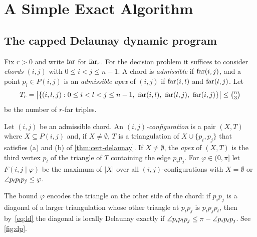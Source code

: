 \chapter{A Simple Exact Algorithm}\label{ch:exact}
\section{The capped Delaunay dynamic program}\label{sec:dp}

Fix $r>0$ and write $\mathrm{far}$ for $\mathrm{far}_r$. For the decision problem it suffices
to consider \emph{chords} $(i,j)$ with $0\le i<j\le n-1$. A chord is
\emph{admissible} if $\mathrm{far}(i,j)$, and a point $p_l\in P(i,j)$ is an
\emph{admissible apex} of $(i,j)$ if $\mathrm{far}(i,l)$ and $\mathrm{far}(l,j)$. Let
\[
\Tr=\bigl|\{(i,l,j): 0\le i<l<j\le n-1,\ \far(i,l),\ \far(l,j),\ \far(i,j)\}\bigr|\le\tbinom n3
\]
be the number of $r$-far triples.

\begin{definition}\label{def:config}
Let $(i,j)$ be an admissible chord. An \emph{$(i,j)$-configuration} is a pair
$(X,T)$ where $X\subseteq P(i,j)$ and, if $X\neq\emptyset$, $T$ is a
triangulation of $X\cup\{p_i,p_j\}$ that satisfies (a) and (b) of
\cref{thm:cert-delaunay}. If $X\ne\emptyset$, the \emph{apex} of $(X,T)$ is
the third vertex $p_l$ of the triangle of $T$ containing the edge $p_ip_j$.
For $\varphi\in(0,\pi]$ let $F(i,j\mid\varphi)$ be the maximum of $|X|$ over
all $(i,j)$-configurations with $X=\emptyset$ or $\angle p_ip_lp_j\le\varphi$.
\end{definition}

The bound $\varphi$ encodes the triangle on the other side of the chord: if
$p_ip_j$ is a diagonal of a larger triangulation whose other triangle at
$p_ip_j$ is $p_ip_jp_t$, then by~\eqref{eq:ld} the diagonal is locally
Delaunay exactly if $\angle p_ip_lp_j\le\pi-\angle p_ip_tp_j$. See
\cref{fig:dp}.

